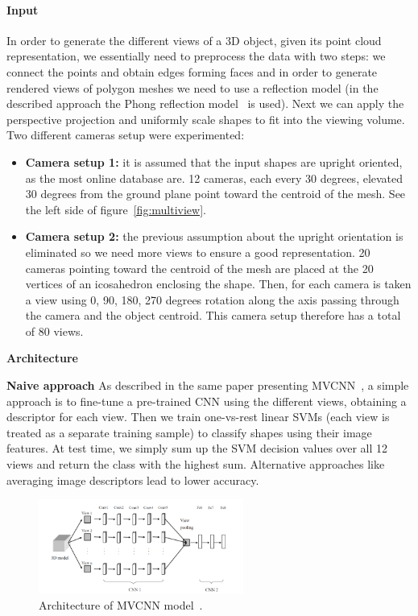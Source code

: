 \paragraph{Input}
In order to generate the different views of a 3D object, given its point cloud representation, we essentially need to preprocess the data with two steps: 
we connect the points and obtain edges forming faces and in order to generate rendered views of
polygon meshes we need to use a reflection model (in the described approach the Phong reflection model~\cite{phong} is used). Next we can apply the perspective projection and uniformly scale shapes to fit into the viewing volume. 
Two different cameras setup were experimented:\begin{itemize}
\item {\textbf{Camera setup 1: } it is assumed that the input shapes are upright oriented, as the most online database are. 12 cameras, each every 30 degrees, elevated 30 degrees from the ground plane point toward the centroid of the mesh. See the left side of figure~\ref{fig:multiview}.}
\item {\textbf{Camera setup 2: } the previous assumption about the upright orientation is eliminated so we need more views to ensure a good representation. 20 cameras pointing toward the centroid of the mesh are placed at the 20 vertices of an icosahedron enclosing the shape. Then, for each camera is taken a view using 0, 90, 180, 270 degrees rotation along the axis passing through the camera and the object centroid. This camera setup therefore has a total of 80 views.}
\end{itemize}

\textbf{Architecture}

\textbf{Naive approach} As described in the same paper presenting MVCNN~\cite{multi_view}, a simple approach is to fine-tune a pre-trained CNN using the different views, obtaining a descriptor for each view. Then we train one-vs-rest linear SVMs (each view is treated as a separate training sample) to classify shapes using their image features. At test time, we simply sum up the SVM decision values over all 12 views and return the class with the highest sum. Alternative approaches like averaging image descriptors lead to lower accuracy.

\begin{figure}[ht]
    \centering
    \includegraphics[width=0.6\textwidth]{images/mvcnn.png}
    \caption{Architecture of MVCNN model~\cite{LBMPFusion}.}
    \label{fig:mvcnn}
\end{figure}

